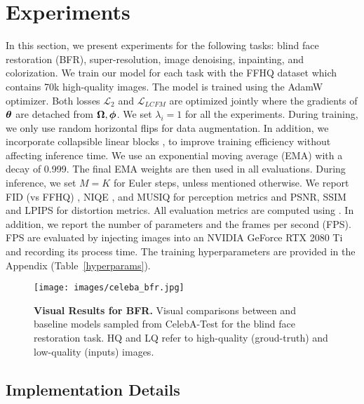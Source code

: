 \section{Experiments}
In this section, we present experiments for the following tasks: blind face restoration (BFR), super-resolution, image denoising, inpainting, and colorization. We train our model for each task with the FFHQ \cite{karras2019style} dataset which contains 70k high-quality images. The model is trained using the AdamW \cite{loshchilovdecoupled} optimizer. Both losses $\mathcal{L}_{2}$ and $\mathcal{L}_{LCFM}$ are optimized jointly where the gradients of $\bm{\theta}$ are detached from $\bm{\Omega},\bm{\phi}$. We set $\lambda_i=1$ for all the experiments. During training, we only use random horizontal flips for data augmentation. In addition, we incorporate collapsible linear blocks \cite{bhardwaj2022collapsible}, to improve training efficiency without affecting inference time. We use an exponential moving average (EMA) with a decay of 0.999. The final EMA weights are then used in all evaluations. During inference, we set $M=K$ for Euler steps, unless mentioned otherwise. We report FID (vs FFHQ) \cite{heusel2017gans}, NIQE \cite{mittal2012making}, and MUSIQ \cite{ke2021musiq} for perception metrics and PSNR, SSIM \cite{wang2004image} and LPIPS \cite{zhang2018perceptual} for distortion metrics. All evaluation metrics are computed using \citet{pyiqa}. In addition, we report the number of parameters and the frames per second (FPS). FPS are evaluated by injecting images into an NVIDIA GeForce RTX 2080 Ti and recording its process time. The training hyperparameters are provided in the Appendix (Table~\ref{hyperparams}).





\begin{figure*}
\centering
\hspace*{0.0cm}\texttt{[image: images/celeba\_bfr.jpg]}
\caption{\textbf{Visual Results for BFR.} Visual comparisons between \name and baseline models sampled from CelebA-Test for the blind face restoration task. HQ and LQ refer to high-quality (groud-truth) and low-quality (inputs) images.}
\label{fig:scheme}
\label{bfr_figure}
\end{figure*}


\subsection{Implementation Details}\label{impl}
